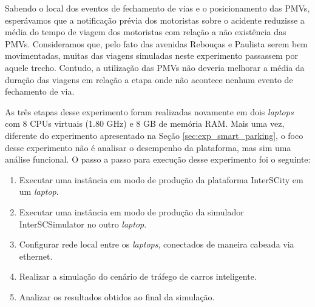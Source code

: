 Sabendo o local dos eventos de fechamento de vias e o posicionamento das PMVs, esperávamos que a notificação prévia dos motoristas sobre o acidente reduzisse a média do tempo de viagem dos motoristas
com relação a não existência das PMVs.
Consideramos que, pelo fato das avenidas Rebouças e Paulista serem bem movimentadas, muitas das viagens simuladas neste experimento passassem por aquele trecho. 
Contudo, a utilização das PMVs não deveria melhorar a média da duração das viagens em relação a etapa onde não acontece nenhum evento de fechamento de via.

As três etapas desse experimento foram realizadas novamente em dois \textit{laptops} com 8 CPUs virtuais (1.80 GHz) e 8 GB de memória RAM.
Mais uma vez, diferente do experimento apresentado na Seção \ref{sec:exp_smart_parking}, o foco desse experimento não é analisar o desempenho da plataforma, mas sim uma análise funcional. 
O passo a passo para execução desse experimento foi o seguinte:

\begin{enumerate}
    \item Executar uma instância em modo de produção da plataforma InterSCity em um \textit{laptop}.

    \item Executar uma instância em modo de produção da simulador InterSCSimulator no outro \textit{laptop}.

    \item Configurar rede local entre os \textit{laptops}, conectados de maneira cabeada via ethernet.

    \item Realizar a simulação do cenário de tráfego de carros inteligente.

    \item Analizar os resultados obtidos ao final da simulação.
\end{enumerate}

